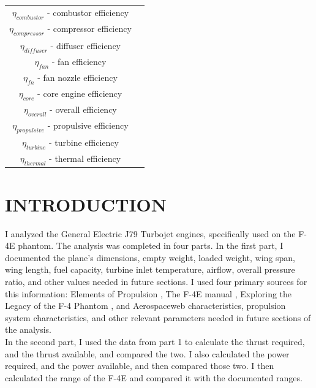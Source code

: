 \documentclass[12pt]{report}
\begin{document}
\begin{table}[H]
    \centering
    \begin{tabular}{c l}
     $\eta_{combustor}$ - combustor efficiency\\
     $\eta_{compressor}$ - compressor efficiency\\
    $\eta_{diffuser}$ - diffuser efficiency\\
    $\eta_{fan}$ - fan efficiency\\
    $\eta_{fn}$ - fan nozzle efficiency\\
    $\eta_{core}$ - core engine efficiency\\
    $\eta_{overall}$ - overall efficiency\\
    $\eta_{propulsive}$ - propulsive efficiency\\
    $\eta_{turbine}$ - turbine efficiency\\
    $\eta_{thermal}$ - thermal efficiency\\
        


    \end{tabular}
\end{table}






\newpage
{}


\chapter{INTRODUCTION}

I analyzed the General Electric J79 Turbojet engines, specifically used on the F-4E phantom. The analysis was completed in four parts. In the first part, I documented the plane's dimensions, empty weight, loaded weight, wing span, wing length, fuel capacity, turbine inlet temperature, airflow, overall pressure ratio, and other values needed in future sections. I used four primary sources for this information: Elements of Propulsion \cite{mattingly2006elements}, The F-4E manual \cite{Internet}, Exploring the Legacy of the F-4 Phantom \cite{Molyneaux_Molyneaux_Petrauskaite_Petrauskaite_2023}, and Aerospaceweb \cite{Doe_2009}
characteristics, propulsion system characteristics, and other relevant
parameters needed in future sections of the analysis.\\

In the second part, I used the data from part 1 to calculate the thrust required, and the thrust available, and compared the two. I also calculated the power required, and the power available, and then compared those two. I then calculated the range of the F-4E and compared it with the documented ranges.\\
\end{document}
